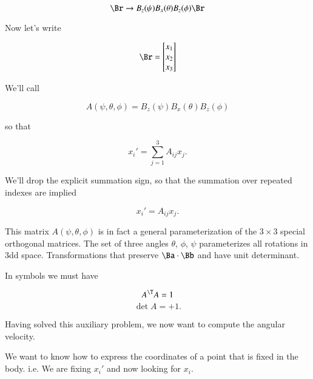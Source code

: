 \begin{equation}\label{eqn:classicalMechanicsEulerAngles:140}
\Br \rightarrow B_z(\psi) B_x(\theta) B_z(\phi) \Br
\end{equation}

Now let's write

\begin{equation}\label{eqn:classicalMechanicsEulerAngles:160}
\Br = 
\begin{bmatrix}
x_1 \\
x_2 \\
x_3
\end{bmatrix}
\end{equation}

We'll call

\begin{equation}\label{eqn:classicalMechanicsEulerAngles:180}
A(\psi, \theta, \phi) = B_z(\psi) B_x(\theta) B_z(\phi) 
\end{equation}

so that

\begin{equation}\label{eqn:classicalMechanicsEulerAngles:200}
x_i' = \sum_{j = 1}^3 A_{ij} x_j.
\end{equation}

We'll drop the explicit summation sign, so that the summation over repeated indexes are implied

\begin{equation}\label{eqn:classicalMechanicsEulerAngles:220}
x_i' = A_{ij} x_j.
\end{equation}

This matrix $A(\psi, \theta, \phi)$ is in fact a general parameterization of the $3 \times 3$ special orthogonal matrices. The set of three angles $\theta$, $\phi$, $\psi$ parameterizes all rotations in 3dd space.  Transformations that preserve $\Ba \cdot \Bb$ and have unit determinant.

In symbols we must have

\begin{equation}\label{eqn:classicalMechanicsEulerAngles:240}
A^\T A = 1
\end{equation}
\begin{equation}\label{eqn:classicalMechanicsEulerAngles:260}
\det A = +1.
\end{equation}

Having solved this auxiliary problem, we now want to compute the angular velocity.

We want to know how to express the coordinates of a point that is fixed in the body.  i.e. We are fixing $x_i'$ and now looking for $x_i$.

